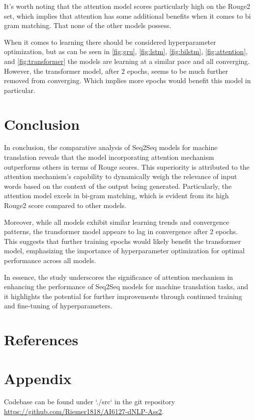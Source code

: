 \documentclass{article}
\begin{document}
It's worth noting that the attention model scores particularly high on the Rouge2 set, which implies that attention has some additional benefits when it comes to bi gram matching. That none of the other models possess.

When it comes to learning there should be considered hyperparameter optimization, but as can be seen in \ref{fig:gru}, \ref{fig:lstm}, \ref{fig:bilstm}, \ref{fig:attention}, and \ref{fig:transformer} the models are learning at a similar pace and all converging. However, the transformer model, after 2 epochs, seems to be much further removed from converging. Which implies more epochs would benefit this model in particular. 

\section{Conclusion}

In conclusion, the comparative analysis of Seq2Seq models for machine translation reveals that the model incorporating attention mechanism outperforms others in terms of Rouge scores. This superiority is attributed to the attention mechanism's capability to dynamically weigh the relevance of input words based on the context of the output being generated. Particularly, the attention model excels in bi-gram matching, which is evident from its high Rouge2 score compared to other models.

Moreover, while all models exhibit similar learning trends and convergence patterns, the transformer model appears to lag in convergence after 2 epochs. This suggests that further training epochs would likely benefit the transformer model, emphasizing the importance of hyperparameter optimization for optimal performance across all models.

In essence, the study underscores the significance of attention mechanism in enhancing the performance of Seq2Seq models for machine translation tasks, and it highlights the potential for further improvements through continued training and fine-tuning of hyperparameters.
\section{References}


\section{Appendix}

Codebase can be found under `./src` in the git repository \url{https://github.com/Riemer1818/AI6127-dNLP-Ass2}.
\end{document}
